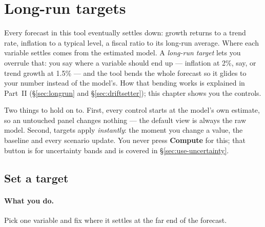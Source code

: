 \documentclass[11pt]{article}
\theoremstyle{definition}
\theoremstyle{remark}
\begin{document}
\section{Long-run targets}\label{sec:use-longrun}

Every forecast in this tool eventually settles down: growth returns to a trend rate,
inflation to a typical level, a fiscal ratio to its long-run average. Where each
variable settles comes from the estimated model. A \emph{long-run target} lets you
overrule that: you say where a variable should end up --- inflation at 2\%, say, or
trend growth at 1.5\% --- and the tool bends the whole forecast so it glides to your
number instead of the model's. How that bending works is explained in Part~II
(\S\ref{sec:longrun} and \S\ref{sec:driftsetter}); this chapter shows you the controls.

Two things to hold on to. First, every control starts at the model's own estimate, so
an untouched panel changes nothing --- the default view is always the raw model.
Second, targets apply \emph{instantly}: the moment you change a value, the baseline and
every scenario update. You never press \textbf{Compute} for this; that button is for
uncertainty bands and is covered in \S\ref{sec:use-uncertainty}.

\subsection{Set a target}

\paragraph{What you do.} Pick one variable and fix where it settles at the far end of
the forecast.
\end{document}
